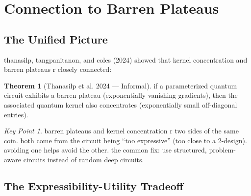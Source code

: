 \documentclass[11pt,a4paper]{article}
\theoremstyle{definition}
\newtheorem{theorem}{Theorem}[section]
\theoremstyle{remark}
\newtheorem*{keypoint}{Key Point}
\begin{document}
\section{Connection to Barren Plateaus}

\subsection{The Unified Picture}

thanasilp, tangpanitanon, and coles (2024) showed that kernel concentration and barren plateaus r closely connected:

\begin{theorem}[Thanasilp et al. 2024 --- Informal]
if a parameterized quantum circuit exhibits a barren plateau (exponentially vanishing gradients), then the associated quantum kernel also concentrates (exponentially small off-diagonal entries).
\end{theorem}

\begin{keypoint}
barren plateaus and kernel concentration r two sides of the same coin. both come from the circuit being ``too expressive'' (too close to a 2-design). avoiding one helps avoid the other. the common fix: use structured, problem-aware circuits instead of random deep circuits.
\end{keypoint}

\subsection{The Expressibility-Utility Tradeoff}

\begin{center}
\end{center}
\end{document}
